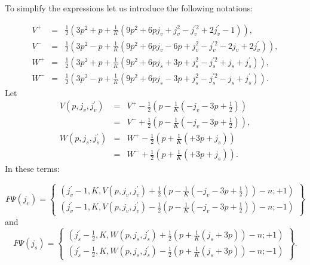 \documentclass{article}
\begin{document}
To simplify the expressions let us introduce the following notations:

\begin{eqnarray*}
V^{+} &=&\frac{1}{2}\left( 3p^{2}+p+\frac{1}{K}\left(
9p^{2}+6pj_{v}+j_{v}^{2}-j_{v}^{\prime 2}+2j_{v}^{\prime }-1\right) \right) ,
\\
V^{-} &=&\frac{1}{2}\left( 3p^{2}-p+\frac{1}{K}\left(
9p^{2}+6pj_{v}-6p+j_{v}^{2}-j_{v}^{\prime 2}-2j_{v}+2j_{v}^{\prime }\right)
\right) , \\
W^{+} &=&\frac{1}{2}\left( 3p^{2}+p+\frac{1}{K}\left(
9p^{2}+6pj_{s}+3p+j_{s}^{2}-j_{s}^{\prime 2}+j_{s}+j_{s}^{\prime }\right)
\right) , \\
W^{-} &=&\frac{1}{2}\left( 3p^{2}-p+\frac{1}{K}\left(
9p^{2}+6pj_{s}-3p+j_{s}^{2}-j_{s}^{\prime 2}-j_{s}+j_{s}^{\prime }\right)
\right) .
\end{eqnarray*}
Let
\begin{eqnarray*}
V\left( p,j_{v},j_{v}^{\prime }\right)  &=&V^{+}-\frac{1}{2}\left( p-\frac{1%
}{K}\left( -j_{v}-3p+\frac{1}{2}\right) \right)  \\
&=&V^{-}+\frac{1}{2}\left( p-\frac{1}{K}\left( -j_{v}-3p+\frac{1}{2}\right)
\right) , \\
W\left( p,j_{s},j_{s}^{\prime }\right)  &=&W^{+}-\frac{1}{2}\left( p+\frac{1%
}{K}\left( +3p+j_{s}\right) \right)  \\
&=&W^{-}+\frac{1}{2}\left( p+\frac{1}{K}\left( +3p+j_{s}\right) \right) .
\end{eqnarray*}
In these terms:

\begin{equation*}
F\Psi \left( j_{v}\right) =\left\{
\begin{array}{c}
\left( j_{v}^{\prime }-1,K,V\left( p,j_{v},j_{v}^{\prime }\right) +\frac{1}{2%
}\left( p-\frac{1}{K}\left( -j_{v}-3p+\frac{1}{2}\right) \right)
-n;+1\right)  \\
\left( j_{v}^{\prime }-1,K,V\left( p,j_{v},j_{v}^{\prime }\right) -\frac{1}{2%
}\left( p-\frac{1}{K}\left( -j_{v}-3p+\frac{1}{2}\right) \right)
-n;-1\right)
\end{array}
\right\}
\end{equation*}
and
\begin{equation*}
F\Psi \left( j_{s}\right) =\left\{
\begin{array}{c}
\left( j_{s}^{\prime }-\frac{1}{2},K,W\left( p,j_{s},j_{s}^{\prime }\right) +%
\frac{1}{2}\left( p+\frac{1}{K}\left( j_{s}+3p\right) \right) -n;+1\right)
\\
\left( j_{s}^{\prime }-\frac{1}{2},K,W\left( p,j_{s},j_{s}^{\prime }\right) -%
\frac{1}{2}\left( p+\frac{1}{K}\left( j_{s}+3p\right) \right) -n;-1\right)
\end{array}
\right\} .
\end{equation*}
\end{document}
